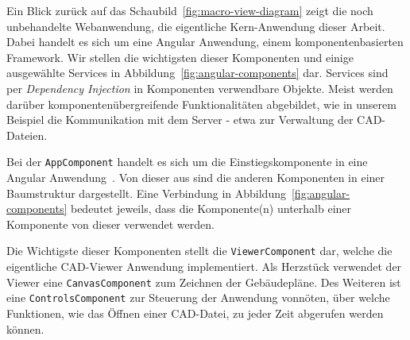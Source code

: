 Ein Blick zurück auf das Schaubild~\ref{fig:macro-view-diagram} zeigt die noch unbehandelte Webanwendung, die eigentliche Kern-Anwendung dieser Arbeit.
Dabei handelt es sich um eine Angular Anwendung, einem komponentenbasierten Framework.
Wir stellen die wichtigsten dieser Komponenten und einige ausgewählte Services in Abbildung~\ref{fig:angular-components} dar.
Services sind per \textit{Dependency Injection} in Komponenten verwendbare Objekte.
Meist werden darüber komponentenübergreifende Funktionalitäten abgebildet, wie in unserem Beispiel die Kommunikation mit dem Server - etwa zur Verwaltung der CAD-Dateien.

Bei der \texttt{AppComponent} handelt es sich um die Einstiegskomponente in eine Angular Anwendung~\cite{AngularEntryComponent}.
Von dieser aus sind die anderen Komponenten in einer Baumstruktur dargestellt.
Eine Verbindung in Abbildung~\ref{fig:angular-components} bedeutet jeweils, dass die Komponente(n) unterhalb einer Komponente von dieser verwendet werden.

Die Wichtigste dieser Komponenten stellt die \texttt{ViewerComponent} dar, welche die eigentliche CAD-Viewer Anwendung implementiert.
Als Herzstück verwendet der Viewer eine \texttt{CanvasComponent} zum Zeichnen der Gebäudepläne.
Des Weiteren ist eine \texttt{ControlsComponent} zur Steuerung der Anwendung vonnöten, über welche Funktionen, wie das Öffnen einer CAD-Datei, zu jeder Zeit abgerufen werden können.

